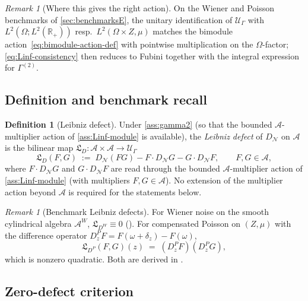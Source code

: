 \documentclass[11pt,reqno]{amsart}
\theoremstyle{plain}
\theoremstyle{definition}
\newtheorem{definition}[theorem]{Definition}
\theoremstyle{remark}
\newtheorem{remark}[theorem]{Remark}
\newcommand{\R}{\mathbb{R}}
\newcommand{\cA}{\mathcal A}
\newcommand{\cN}{\mathcal N}
\newcommand{\cU}{\mathcal U}
\newcommand{\dN}{D_{\cN}}
\newcommand{\Lleib}{\mathfrak L}
\begin{document}
\begin{remark}[Where this gives the right action]\label{rem:Linf-where}
On the Wiener and Poisson benchmarks of \cref{sec:benchmarksE},
the unitary identification of $\cU_{\Gamma}$ with
$L^{2}(\Omega;L^{2}(\R_{+}))$ resp.\ $L^{2}(\Omega\times Z,\mu)$
matches the bimodule action~\eqref{eq:bimodule-action-def} with
pointwise multiplication on the $\Omega$-factor;
\eqref{eq:Linf-consistency} then reduces to Fubini together with
the integral expression for $\Gamma^{(2)}$.
\end{remark}

\subsection{Definition and benchmark recall}\label{sec:leibniz-def}

\begin{definition}[Leibniz defect]\label{def:leibniz}
Under \cref{ass:gamma2} (so that the bounded $\cA$-multiplier
action of \cref{ass:Linf-module} is available), the
\emph{Leibniz defect} of $\dN$ on $\cA$ is the bilinear map
$\Lleib_{D}\colon\cA\times\cA\to\cU_{\Gamma}$
\begin{equation}\label{eq:leibniz-defect}
  \Lleib_{D}(F,G)\;:=\;\dN(FG)-F\cdot\dN G-G\cdot\dN F,
  \qquad F,G\in\cA,
\end{equation}
where $F\cdot\dN G$ and $G\cdot\dN F$ are read through the
bounded $\cA$-multiplier action of \cref{ass:Linf-module} (with
multipliers $F,G\in\cA$). No extension of the multiplier action
beyond $\cA$ is required for the statements below.
\end{definition}

\begin{remark}[Benchmark Leibniz defects]\label{rem:leibniz-benchmarks-recall}
For Wiener noise on the smooth cylindrical algebra $\cA^{W}$,
$\Lleib_{D^{W}}\equiv 0$ (\cite[Prop.~1.2.3]{Nualart}). For
compensated Poisson on $(Z,\mu)$ with the difference operator
$D^{P}_{z}F=F(\omega+\delta_{z})-F(\omega)$,
\begin{equation}\label{eq:leibniz-defect-poisson-recall}
  \Lleib_{D^{P}}(F,G)(z)\;=\;(D^{P}_{z}F)(D^{P}_{z}G),
\end{equation}
which is nonzero quadratic. Both are derived in
\cite[\S 4.2]{PrimitiveDivergence}.
\end{remark}

\subsection{Zero-defect criterion}\label{sec:leibniz-zero}
\end{document}
